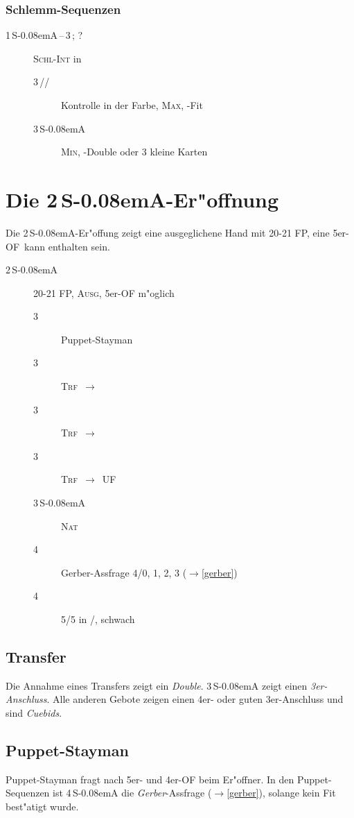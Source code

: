 \documentclass[11pt,german,twocolumn]{scrartcl}
\def\pik{\nobreak\,\Sp\xspace}
\def\coe{\nobreak\,\He\xspace}
\def\kar{\nobreak\,\Di\xspace}
\def\tre{\nobreak\,\Cl\xspace}
\def\pi{\Sp\xspace}
\def\co{\He\xspace}
\def\tr{\Cl\xspace}
\def\ra{$\rightarrow$\xspace}
\def\ufa{\nobreak\textsf{UF}\xspace}
\def\ofa{\nobreak\textsf{OF}\xspace}
\def\sa{\nobreak\textsf{S\kern-0.08emA}\xspace}
\def\SA{\nobreak\,\sa}
\def\sep{\,--\,}
\newcommand{\conv}[1]{\emph{#1}}
\def\bal{\textsc{Ausg}\xspace}
\def\nat{\textsc{Nat}\xspace}
\def\maxi{\textsc{Max}\xspace}
\def\mini{\textsc{Min}\xspace}
\def\bdsc{\begin{description}}
\def\edsc{\end{description}}
\def\xfer{\textsc{Trf}\xspace}
\def\xferto{\xfer~\ra~}
\def\slamint{\textsc{Schl-Int}\xspace}
\newcommand{\Index}[1]{#1\index{#1}}
\begin{document}
\subsubsection{Schlemm-Sequenzen}

\bdsc
  \item[1\SA{}\sep3\tre; ?] \slamint in \tr
  \bdsc
    \item[3\kar/\co/\pi] Kontrolle in der Farbe, \maxi, \tr-Fit
    \item[3\SA] \mini, \tr-Double oder 3 kleine Karten
  \edsc
\edsc

\newpage
\section{Die 2\SA-Er"offnung}

Die 2\SA-Er"offung zeigt eine ausgeglichene Hand mit 20-21 FP, eine 5er-\ofa\
kann enthalten sein.

\bdsc
\item[2\SA] 20-21 FP, \bal, 5er-\ofa m"oglich
  \bdsc
  \item[3\tre] Puppet-Stayman
  \item[3\kar] \xferto \co
  \item[3\coe] \xferto \pi
  \item[3\pik] \xferto \ufa
  \item[3\SA] \nat
  \item[4\tre] \Index{Gerber}-Assfrage 4/0, 1, 2, 3 (\ra \ref{gerber})
  \item[4\kar] 5/5 in \pi/\co, schwach
  \edsc
\edsc

\subsection{Transfer}

Die Annahme eines Transfers zeigt ein \emph{Double}. 3\SA zeigt einen
\emph{3er-Anschluss}. Alle anderen Gebote zeigen einen 4er- oder guten
3er-Anschluss und sind \emph{Cuebids}.

\subsection{Puppet-Stayman}

Puppet-Stayman fragt nach 5er- und 4er-\ofa beim Er"offner. In den
Puppet-Sequenzen ist 4\SA die \conv{Gerber}-Assfrage (\ra \ref{gerber}),
solange kein Fit best"atigt wurde.
\end{document}
